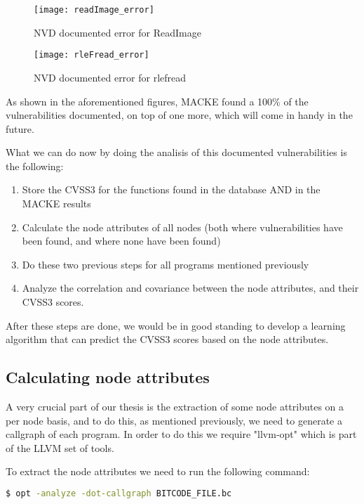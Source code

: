 \begin{figure}[!htb]
	\caption{NVD documented error for ReadImage}
	\centering
	\texttt{[image: readImage\_error]}
\end{figure}

\begin{figure}[!htb]
	\caption{NVD documented error for rlefread}
	\centering
	\texttt{[image: rleFread\_error]}
\end{figure}

As shown in the aforementioned figures, MACKE found a 100\% of the vulnerabilities documented, on top of one more, which will come in handy in the future. 

What we can do now by doing the analisis of this documented vulnerabilities is the following:

\begin{enumerate}
	\item Store the CVSS3 for the functions found in the database AND in the MACKE results
	\item Calculate the node attributes of all nodes (both where vulnerabilities have been found, and where none have been found)
	\item Do these two previous steps for all programs mentioned previously
	\item Analyze the correlation and covariance between the node attributes, and their CVSS3 scores.
\end{enumerate} 

After these steps are done, we would be in good standing to develop a learning algorithm that can predict the CVSS3 scores based on the node attributes.

\subsection{Calculating node attributes}

A very crucial part of our thesis is the extraction of some node attributes on a per node basis, and to do this, as mentioned previously, we need to generate a callgraph of each program. In order to do this we require "llvm-opt" which is part of the LLVM \parencite{llvm} set of tools.

To extract the node attributes we need to run the following command:

\begin{lstlisting}[language=bash]
$ opt -analyze -dot-callgraph BITCODE_FILE.bc
\end{lstlisting}

